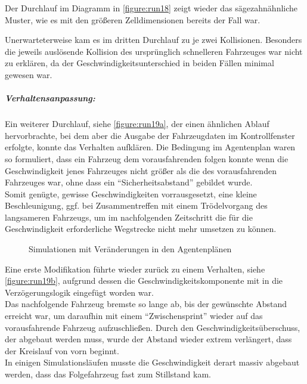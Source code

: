 Der Durchlauf im Diagramm in \cref{figure:run18} zeigt wieder das sägezahnähnliche Muster, wie es mit den größeren Zelldimensionen bereits der Fall war.

Unerwarteterweise kam es im dritten Durchlauf zu je zwei Kollisionen.
Besonders die jeweils auslösende Kollision des ursprünglich schnelleren Fahrzeuges war nicht zu erklären, da der Geschwindigkeitsunterschied in beiden Fällen minimal gewesen war.

\subparagraph*{Verhaltensanpassung:}
Ein weiterer Durchlauf, siehe \cref{figure:run19a}, der einen ähnlichen Ablauf hervorbrachte, bei dem aber die Ausgabe der Fahrzeugdaten im Kontrollfenster erfolgte, konnte das Verhalten aufklären.
Die Bedingung im Agentenplan waren so formuliert, dass ein Fahrzeug dem vorausfahrenden folgen konnte wenn die Geschwindigkeit jenes Fahrzeuges nicht größer als die des vorausfahrenden Fahrzeuges war, ohne dass ein \enquote{Sicherheitsabstand} gebildet wurde. 
\\
Somit genügte, gewisse Geschwindigkeiten vorrausgesetzt, eine kleine Beschleunigung, ggf. bei Zusammentreffen mit einem Trödelvorgang des langsameren Fahrzeugs, um im nachfolgenden Zeitschritt die für die Geschwindigkeit erforderliche Wegstrecke nicht mehr umsetzen zu können.

\begin{figure}[hptb]
  \centering 
   \qquad 
   \qquad 
  \caption{Simulationen mit Veränderungen in den Agentenplänen} 
  \label{figure:run19a-c}
\end{figure}

Eine erste Modifikation führte wieder zurück zu einem Verhalten, siehe \cref{figure:run19b}, aufgrund dessen die Geschwindigkeitskomponente mit in die Verzögerungslogik eingefügt worden war. 
\\
Das nachfolgende Fahrzeug bremste so lange ab, bis der gewünschte Abstand erreicht war, um daraufhin mit einem \enquote{Zwischensprint} wieder auf das vorausfahrende Fahrzeug aufzuschließen.
Durch den Geschwindigkeitsüberschuss, der abgebaut werden muss, wurde der Abstand wieder extrem verlängert, dass der Kreislauf von vorn beginnt.
\\
In einigen Simulationsläufen musste die Geschwindigkeit derart massiv abgebaut werden, dass das Folgefahrzeug fast zum Stillstand kam.


